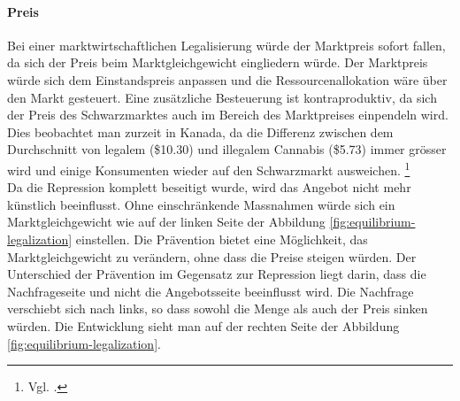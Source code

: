 \documentclass[../main.tex]{subfiles}
\begin{document}
	 \paragraph{Preis}
	 Bei einer marktwirtschaftlichen Legalisierung würde der Marktpreis sofort fallen, da sich der Preis beim Marktgleichgewicht eingliedern würde. 
	 Der Marktpreis würde sich dem Einstandspreis anpassen und die Ressourcenallokation wäre über den Markt gesteuert.
	 Eine zusätzliche Besteuerung ist kontraproduktiv, da sich der Preis des Schwarzmarktes auch im Bereich des Marktpreises einpendeln wird.
	 Dies beobachtet man zurzeit in Kanada, da die Differenz zwischen dem Durchschnitt von legalem (\$10.30) und illegalem Cannabis (\$5.73) immer grösser wird und einige Konsumenten wieder auf den Schwarzmarkt ausweichen.%
	 \footnote{Vgl. \cite{cbc-01}.}\\
	 
	 \noindent
	 Da die Repression komplett beseitigt wurde, wird das Angebot nicht mehr künstlich beeinflusst.
	 Ohne einschränkende Massnahmen würde sich ein Marktgleichgewicht wie auf der linken Seite der Abbildung \ref{fig:equilibrium-legalization} einstellen.
	 Die Prävention bietet eine Möglichkeit, das Marktgleichgewicht zu verändern, ohne dass die Preise steigen würden.
	 Der Unterschied der Prävention im Gegensatz zur Repression liegt darin, dass die Nachfrageseite und nicht die Angebotsseite beeinflusst wird.
	 Die Nachfrage verschiebt sich nach links, so dass sowohl die Menge als auch der Preis sinken würden.
	 Die Entwicklung sieht man auf der rechten Seite der Abbildung \ref{fig:equilibrium-legalization}.
	 
\end{document}
